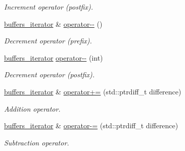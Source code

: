\begin{DoxyCompactItemize}
\begin{DoxyCompactList}\small\item\em Increment operator (postfix). \end{DoxyCompactList}\item 
\hyperlink{classasio_1_1buffers__iterator}{buffers\+\_\+iterator} \& \hyperlink{classasio_1_1buffers__iterator_afb3462226c0206c1faf34cd5d2fe3d8c}{operator-\/-\/} ()
\begin{DoxyCompactList}\small\item\em Decrement operator (prefix). \end{DoxyCompactList}\item 
\hyperlink{classasio_1_1buffers__iterator}{buffers\+\_\+iterator} \hyperlink{classasio_1_1buffers__iterator_a132650032bfd3d9f8920fe7bafdf9bf1}{operator-\/-\/} (int)
\begin{DoxyCompactList}\small\item\em Decrement operator (postfix). \end{DoxyCompactList}\item 
\hyperlink{classasio_1_1buffers__iterator}{buffers\+\_\+iterator} \& \hyperlink{classasio_1_1buffers__iterator_adaf6a1cad1a5286fbf8945330a482111}{operator+=} (std\+::ptrdiff\+\_\+t difference)
\begin{DoxyCompactList}\small\item\em Addition operator. \end{DoxyCompactList}\item 
\hyperlink{classasio_1_1buffers__iterator}{buffers\+\_\+iterator} \& \hyperlink{classasio_1_1buffers__iterator_a1f822a929823b3f7e4a71c5261a290cf}{operator-\/=} (std\+::ptrdiff\+\_\+t difference)
\begin{DoxyCompactList}\small\item\em Subtraction operator. \end{DoxyCompactList}\end{DoxyCompactItemize}
